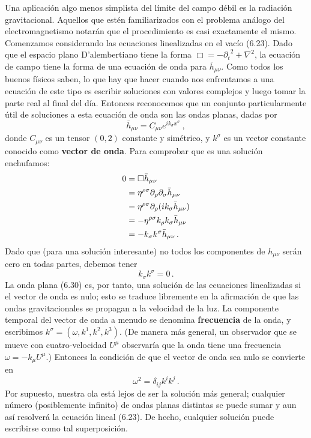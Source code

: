\documentclass[11pt,b5paper,openany,twoside]{book}
\newcommand{\mn}{{\mu\nu}}
\newcommand{\p}[1]{{\partial_{#1}}}
\def\bh{{\bar h}}
\begin{document}
Una aplicación algo menos simplista del límite del campo débil es la radiación gravitacional.
Aquellos que estén familiarizados con el problema análogo del electromagnetismo notarán que el procedimiento es casi exactamente el mismo.
Comenzamos considerando las ecuaciones linealizadas en el vacío (6.23).
Dado que el espacio plano D'alembertiano tiene la forma $\Box = -\p{t}^2 +\nabla^2$, la ecuación de campo tiene la forma de una ecuación de onda para $\bh_\mn$.
Como todos los buenos físicos saben, lo que hay que hacer cuando nos enfrentamos a una ecuación de este tipo es escribir soluciones con valores complejos y luego tomar la parte real al final del día.
Entonces reconocemos que un conjunto particularmente útil de soluciones a esta ecuación de onda son las ondas planas, dadas por
\begin{equation}
\bh_\mn = C_\mn e^{ik_\sigma x^\sigma}\ ,\label{6.30}
\end{equation}
donde $C_\mn$ es un tensor $(0,2)$ constante y simétrico, y $k^\sigma$ es un vector constante conocido como {\bf vector de onda}.
Para comprobar que es una solución enchufamos:
\begin{align}
0 &=  \Box \bh_\mn \notag \\
&=  \eta^{\rho\sigma}\p\rho\p\sigma
\bh_\mn \notag \\
&=  \eta^{\rho\sigma}\p\rho (i k_\sigma\bh_\mn) \notag \\
&=  - \eta^{\rho\sigma}k_\rho k_\sigma\bh_\mn \notag \\
&=  -k_\sigma k^\sigma \bh_\mn\,. \label{6.31}
\end{align}
Dado que (para una solución interesante) no todos los componentes de $h_\mn$ serán cero en todas partes, debemos tener
\begin{equation}
k_\sigma k^\sigma=0\,.\label{6.32}
\end{equation}
La onda plana (6.30) es, por tanto, una solución de las ecuaciones linealizadas si el vector de onda es nulo; esto se traduce libremente en la afirmación de que las ondas gravitacionales se propagan a la velocidad de la luz.
La componente temporal del vector de onda a menudo se denomina {\bf frecuencia} de la onda, y escribimos $k^\sigma = (\omega, k^1,k^2,k^3)$.
(De manera más general, un observador que se mueve con cuatro-velocidad $U^\mu$ observaría que la onda tiene una frecuencia $\omega=-k_\mu U^\mu$.)
Entonces la condición de que el vector de onda sea nulo se convierte en
\begin{equation}
\omega^2 = \delta_{ij}k^i k^j\,.\label{6.33}
\end{equation}
Por supuesto, nuestra ola está lejos de ser la solución más general; cualquier número (posiblemente infinito) de ondas planas distintas se puede sumar y aun así resolverá la ecuación lineal (6.23).
De hecho, cualquier solución puede escribirse como tal superposición.
\end{document}
